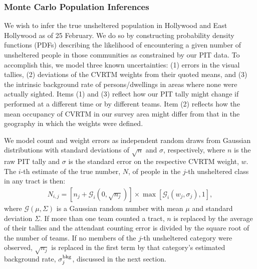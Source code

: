 \documentclass[11pt,twocolumn]{article}
\def\resp{respectively}
\begin{document}
%
%

\subsubsection{Monte Carlo Population Inferences}
\label{sec:mc}

We wish to infer the true unsheltered population in Hollywood and East Hollywood as of 25 February. 
We do so by constructing probability density functions (PDFs) describing the likelihood of encountering 
a given number of unsheltered people in those communities as constrained by our PIT data. 
To accomplish this, we model three known uncertainties: (1) errors in the visual tallies, (2) deviations 
of the CVRTM weights from their quoted means, and (3) the intrinsic background rate of persons/dwellings
in areas where none were actually sighted. Items (1) and (3) reflect how our PIT tally might change
if performed at a different time or by different teams. Item (2) reflects how the mean 
occupancy of CVRTM in our survey area might differ from that in the geography in which the weights 
were defined.

We model count and weight errors as independent random draws from Gaussian distributions with 
standard deviations of $\sqrt{n}$ and $\sigma$, \resp, where $n$ is the raw PIT tally and 
$\sigma$ is the standard error on the respective CVRTM weight, $w$. 
The $i$-th estimate of the true number, $N$, of people in the $j$-th unsheltered class in any 
tract is then: 
\begin{multline}\label{eq:monte}
	N_{i,j} = \left[n_{j} + \mathcal{G}_{i}(0,\sqrt{n_{j}})\right]\times\max[\mathcal{G}_{i}(w_{j}, \sigma_{j}),1],
\end{multline}
where $\mathcal{G}(\mu,\Sigma)$ is a Gaussian random number with mean $\mu$ and standard deviation 
$\Sigma$. If more than one team counted a tract, $n$ is replaced by the average of their tallies 
and the attendant counting error is divided by the square root of the number of teams. If no members
of the $j$-th unsheltered category were observed, $\sqrt{n_{j}}$ is replaced in the first term 
by that category's estimated background rate, $\sigma_{j}^{\rm bkg}$, discussed in the next section.%
\end{document}
